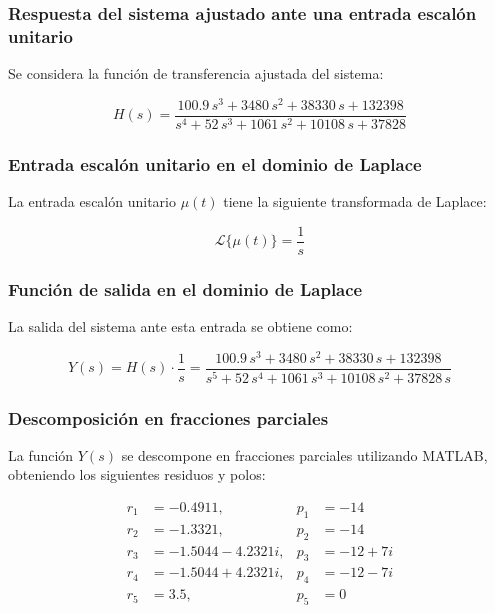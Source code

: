 \documentclass[11pt,letterpaper]{article}
\begin{document}
\subsubsection{Respuesta del sistema ajustado ante una entrada escalón unitario}

Se considera la función de transferencia ajustada del sistema:

\begin{equation}
H(s) = \frac{100.9\,s^3 + 3480\,s^2 + 38330\,s + 132398}{s^4 + 52\,s^3 + 1061\,s^2 + 10108\,s + 37828}
\end{equation}

\subsubsection{Entrada escalón unitario en el dominio de Laplace}

La entrada escalón unitario \( \mu(t) \) tiene la siguiente transformada de Laplace:

\begin{equation}
\mathcal{L}\{\mu(t)\} = \frac{1}{s}
\end{equation}

\subsubsection{Función de salida en el dominio de Laplace}

La salida del sistema ante esta entrada se obtiene como:

\begin{equation}
Y(s) = H(s) \cdot \frac{1}{s} =
\frac{100.9\,s^3 + 3480\,s^2 + 38330\,s + 132398}{s^5 + 52\,s^4 + 1061\,s^3 + 10108\,s^2 + 37828\,s}
\end{equation}

\subsubsection{Descomposición en fracciones parciales}

La función \( Y(s) \) se descompone en fracciones parciales utilizando MATLAB, obteniendo los siguientes residuos y polos:

\begin{align*}
r_1 &= -0.4911,     & p_1 &= -14 \\
r_2 &= -1.3321,     & p_2 &= -14 \\
r_3 &= -1.5044 - 4.2321i, & p_3 &= -12 + 7i \\
r_4 &= -1.5044 + 4.2321i, & p_4 &= -12 - 7i \\
r_5 &= 3.5,         & p_5 &= 0
\end{align*}
\end{document}
